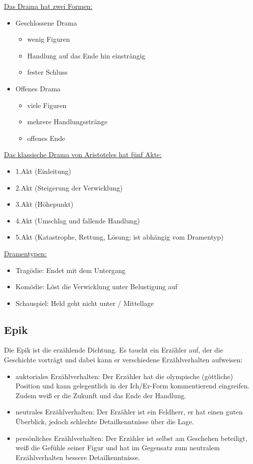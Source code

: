 \documentclass[12pt,a4paper]{article}
\begin{document}
\underline{Das Drama hat zwei Formen:}

	\begin{itemize}
	\item Geschlossene Drama
		\begin{itemize}
		\item wenig Figuren
		\item Handlung auf das Ende hin einsträngig
		\item fester Schluss
		\end{itemize}
	\item Offenes Drama
		\begin{itemize}
		\item viele Figuren
		\item mehrere Handlungsstränge
		\item offenes Ende
		\end{itemize}
	\end{itemize}
	
\underline{Das klassische Drama von Aristoteles hat fünf Akte:}

	\begin{itemize}
	\item 1.Akt (Einleitung)
	\item 2.Akt (Steigerung der Verwicklung)
	\item 3.Akt (Höhepunkt)
	\item 4.Akt (Umschlag und fallende Handlung)
	\item 5.Akt (Katastrophe, Rettung, Lösung; ist abhängig vom Dramentyp)
	\end{itemize}
	
\underline{Dramentypen:}

	\begin{itemize}
	\item Tragödie: Endet mit dem Untergang
	\item Komödie: Löst die Verwicklung unter Belustigung auf
	\item Schauspiel: Held geht nicht unter / Mittellage
	\end{itemize}

\subsection{Epik}

Die Epik ist die erzählende Dichtung. Es taucht ein Erzähler auf, der die Geschichte vorträgt und dabei kann er verschiedene Erzählverhalten aufweisen:

	\begin{itemize}
	\item auktoriales Erzählverhalten: Der Erzähler hat die olympische (göttliche) Position und kann gelegentlich in der Ich/Er-Form kommentierend eingreifen. Zudem weiß er die Zukunft und das Ende der Handlung.
	\item neutrales Erzählverhalten: Der Erzähler ist ein Feldherr, er hat einen guten Überblick, jedoch schlechte Detailkenntnisse über die Lage.
	\item persönliches Erzählverhalten: Der Erzähler ist selbst am Geschehen  beteiligt, weiß die Gefühle seiner Figur und hat im Gegensatz zum neutralem Erzählverhalten bessere Detailkenntnisse.
	\end{itemize}
	
\end{document}
